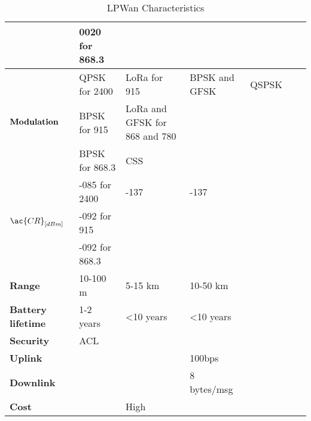 \begin{table}[!ht]
\begin{tabulary}{\textwidth}{L|L|L|L|L|L|L}
	\                                  & 0020 for 868.3 &                                 &               &             &                 &                 \\\hline
	 & QPSK for 2400  & LoRa           for 915          & BPSK and GFSK & QSPSK       &                 &                 \\
	\                                  & BPSK for 915   & LoRa and GFSK  for 868  and 780 &               &             &                 &                 \\
	\                                  & BPSK for 868.3 & \ac{CSS}                        &               &             &                 &                 \\\hline
	 & -085 for 2400  & -137                            & -137          &             &                 &                 \\
	\                                  & -092 for 915   &                                 &               &             &                 &                 \\
	\                                  & -092 for 868.3 &                                 &               &             &                 &                 \\\hline
	\bf{Range}                         & 10-100 m       & 5-15 km                         & 10-50 km      &             &                 &                 \\\hline
	\bf{Battery lifetime}              & 1-2 years      & <10 years                       & <10 years     &             &                 &                 \\\hline
	\bf{Security}                      & ACL            &                                 &               &             &                 &                 \\\hline
	\bf{Uplink}                        &                &                                 & 100bps        &             &                 &                 \\\hline
	\bf{Downlink}                      &                &                                 & 8 bytes/msg   &             &                 &                 \\\hline
	\bf{Cost}                          &                & High                            &               &             &                 &                 \\\hline
	\end{tabulary}
	\caption{\label{tab:LPWan_characteristics} LPWan Characteristics \cite{al-kashoash_comparison_2016}}
\end{table}


